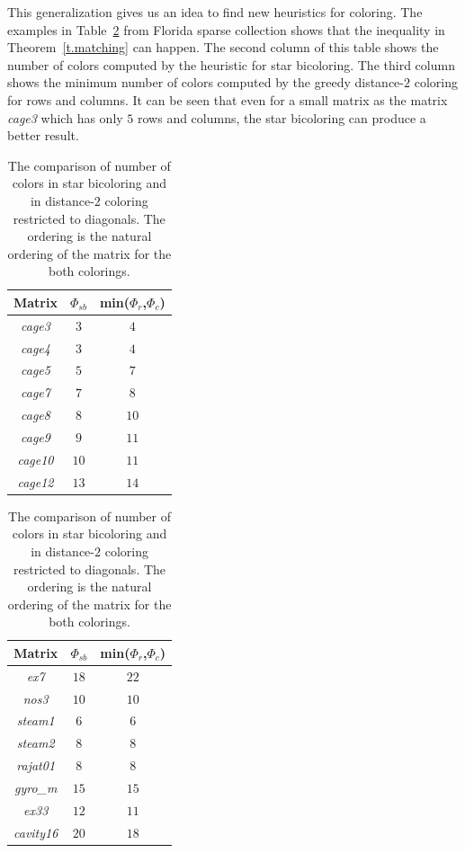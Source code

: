\documentclass[12pt, twoside,a4paper,toc=bibliography]{scrbook}
\begin{document}
This generalization gives us an idea to find new heuristics for coloring.
The examples in Table~\ref{table.starbic.d2.diag} from Florida sparse collection shows that the
inequality in Theorem~\ref{t.matching} can happen. The second column of this table
shows the number of colors computed by the heuristic for star bicoloring.
The third column shows the minimum number of colors computed by the greedy distance-$2$ coloring 
for rows and columns.
It can be seen that even for a small matrix as the matrix \textit{cage3} which has only
$5$ rows and columns, the star bicoloring can produce a better result.

\begin{table}
\centering
\begin{tabular}{|c|c|c|}
\hline
Matrix & $\Phi_{sb}$ & min($\Phi_r$,$\Phi_c$)\\\hline
\textit{cage3} & $3$ & $4$\\\hline
\textit{cage4} & $3$ & $4$ \\\hline
\textit{cage5} & $5$ & $7$\\\hline
\textit{cage7} & $7$  & $8$\\\hline
\textit{cage8} & $8$  & $10$\\\hline
\textit{cage9} & $9$  & $11$\\\hline
\textit{cage10} & $10$ & $11$\\\hline
\textit{cage12} & $13$ &  $14$\\\hline
\end{tabular}
\hfill
\begin{tabular}{|c|c|c|}
\hline
Matrix & $\Phi_{sb}$ & min($\Phi_r$,$\Phi_c$)\\\hline
\textit{ex7} & $18$ & $22$ \\\hline
\textit{nos3} & $10$ & $10$ \\\hline
\textit{steam1} & $6$ & $6$ \\\hline
\textit{steam2} & $8$ & $8$ \\\hline
\textit{rajat01} & $8$ & $8$ \\\hline
\textit{gyro\_m} & $15$ & $15$\\\hline
\textit{ex33} & $12$ & $11$\\\hline
\textit{cavity16} & $20$ & $18$ \\\hline
\end{tabular}

\caption{The comparison of number of colors in star bicoloring and in
distance-$2$ coloring restricted to diagonals.
The ordering is the natural ordering of the matrix for the both colorings.}
\label{table.starbic.d2.diag}
\end{table}
\end{document}
